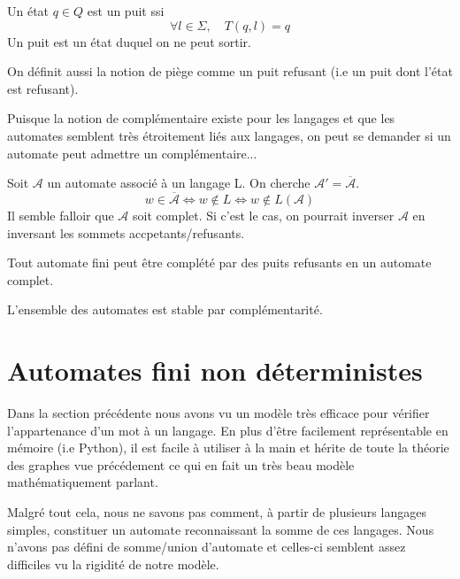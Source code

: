 \begin{definition}[Puit]
    Un état $q \in Q$ est un puit ssi 
        \[ \forall l \in \Sigma, \quad T(q,l) = q \]
    Un puit est un état duquel on ne peut sortir. 
\end{definition}

On définit aussi la notion de piège comme un puit refusant (i.e un puit dont l'état est refusant). 

Puisque la notion de complémentaire existe pour les langages et que les automates semblent très étroitement liés 
aux langages, on peut se demander si un automate peut admettre un complémentaire... 

Soit $\mathcal{A}$ un automate associé à un langage L. On cherche $\mathcal{A}' = \overline{\mathcal{A}}$. 
    \[ w \in \overline{\mathcal{A}} \iff w \not \in L \iff w \not \in L(\mathcal{A}) \] 
Il semble falloir que $\mathcal{A}$ soit complet. Si c'est le cas, on pourrait inverser $\mathcal{A}$ en inversant 
les sommets accpetants/refusants. 

\begin{proposition}
    Tout automate fini peut être complété par des puits refusants en un automate complet. 
\end{proposition}

\begin{theorem}[Complémentarité]
    L'ensemble des automates est stable par complémentarité. 
\end{theorem}


\section{Automates fini non déterministes}

Dans la section précédente nous avons vu un modèle très efficace pour vérifier l'appartenance d'un mot à un langage. 
En plus d'être facilement représentable en mémoire (i.e Python), il est facile à utiliser à la main et 
hérite de toute la théorie des graphes vue précédement ce qui en fait un très beau modèle mathématiquement parlant. 

Malgré tout cela, nous ne savons pas comment, à partir de plusieurs langages simples, constituer un automate 
reconnaissant la somme de ces langages. Nous n'avons pas défini de somme/union d'automate et celles-ci semblent 
assez difficiles vu la rigidité de notre modèle. 

